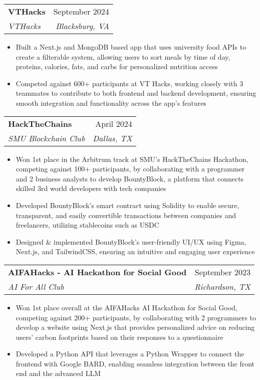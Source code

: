 \documentclass[letterpaper,11pt]{article}
\makeatletter
\newcommand{\resumeItem}[1]{
  \item\small{
    {#1 \vspace{-2pt}}
  }
}
\newcommand{\resumeSubheading}[4]{
  \vspace{-2pt}\item
    \begin{tabular*}{0.97\textwidth}[t]{l@{\extracolsep{\fill}}r}
      \textbf{#1} & #2 \\
      \textit{\small#3} & \textit{\small #4} \\
    \end{tabular*}\vspace{-7pt}
}
\newcommand{\resumeSubSubheading}[2]{
    \item
    \begin{tabular*}{0.97\textwidth}{l@{\extracolsep{\fill}}r}
      \textit{\small#1} & \textit{\small #2} \\
    \end{tabular*}\vspace{-7pt}
}
\newcommand{\resumeSubHeadingListEnd}{\end{itemize}}
\newcommand{\resumeItemListStart}{\begin{itemize}}
\newcommand{\resumeItemListEnd}{\end{itemize}\vspace{-5pt}}
\makeatother
\begin{document}
      \resumeSubheading
      {VTHacks}{September 2024}
      {VTHacks}{Blacksburg, VA}
      \resumeItemListStart
        \resumeItem{Built a Next.js and MongoDB based app that uses university food APIs to create a filterable system, allowing users to sort meals by time of day, proteins, calories, fats, and carbs for personalized nutrition access}
        \resumeItem{Competed against 600+ participants at VT Hacks, working closely with 3 teammates to contribute to both frontend and backend development, ensuring smooth integration and functionality across the app’s features}
      \resumeItemListEnd
      

    \resumeSubheading
      {HackTheChains}{April 2024}
      {SMU Blockchain Club}{Dallas, TX}
      \resumeItemListStart
        \resumeItem{Won 1st place in the Arbitrum track at SMU's HackTheChains Hackathon, competing against 100+ participants, by collaborating with a programmer and 2 business analysts to develop BountyBlock, a platform that connects skilled 3rd world developers with tech companies}
        \resumeItem{Developed BountyBlock's smart contract using Solidity to enable secure, transparent, and easily convertible transactions between companies and freelancers, utilizing stablecoins such as USDC}
        \resumeItem{Designed \& implemented BountyBlock's user-friendly UI/UX using Figma, Next.js, and TailwindCSS, ensuring an intuitive and engaging user experience}
    \resumeItemListEnd

    \resumeSubheading
      {AIFAHacks - AI Hackathon for Social Good}{September 2023}
      {AI For All Club}{Richardson, TX}
      \resumeItemListStart
        \resumeItem{Won 1st place overall at the AIFAHacks AI Hackathon for Social Good, competing against 200+ participants, by collaborating with 2 programmers to develop a website using Next.js that provides personalized advice on reducing users' carbon footprints based on their responses to a questionnaire}
        \resumeItem{Developed a Python API that leverages a Python Wrapper to connect the frontend with Google BARD, enabling seamless integration between the front end and the advanced LLM}
      \resumeItemListEnd
\end{document}
